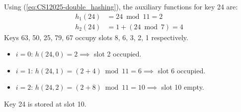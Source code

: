 \begin{enumerate}[label=\thesubsection.\arabic*, ref=\thesubsection.\theenumi]
\vspace{0.2cm}
\solution
Using (\ref{eq:CS12025-double_hashing}), the auxiliary functions for key 24 are:
\begin{align}
h_1(24) &= 24 \bmod 11 = 2 \\
h_2(24) &= 1 + (24 \bmod 7) = 4
\end{align}
Keys 63, 50, 25, 79, 67 occupy slots 8, 6, 3, 2, 1 respectively.
\begin{itemize}
    \item $i=0$: $h(24, 0) = 2 \implies$ slot 2 occupied.
    \item $i=1$: $h(24, 1) = (2 + 4) \bmod 11 = 6 \implies$ slot 6 occupied.
    \item $i=2$: $h(24, 2) = (2 + 8) \bmod 11 = 10 \implies$ slot 10 empty.
\end{itemize}
Key 24 is stored at slot 10.

\end{enumerate}
